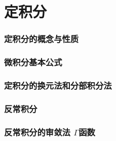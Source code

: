 \documentclass{article}
\begin{document}
  \tableofcontents
  \newpage

  \part{定积分}
  \section{定积分的概念与性质}
    
  \section{微积分基本公式}
    
  \section{定积分的换元法和分部积分法}
    
  \section{反常积分}
    
  \section{反常积分的审敛法 $\Gamma$函数}
    
\end{document}
